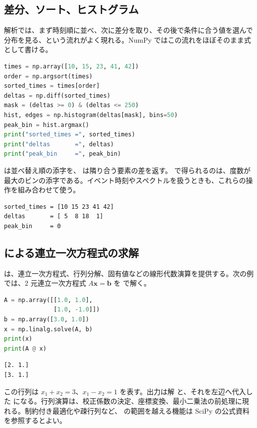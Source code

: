 \subsection{差分、ソート、ヒストグラム}

解析では、まず時刻順に並べ、次に差分を取り、その後で条件に合う値を選んで分布を見る、という流れがよく現れる。NumPy ではこの流れをほぼそのまま式として書ける。

\begin{lstlisting}[language=Python]
times = np.array([10, 15, 23, 41, 42])
order = np.argsort(times)
sorted_times = times[order]
deltas = np.diff(sorted_times)
mask = (deltas >= 0) & (deltas <= 250)
hist, edges = np.histogram(deltas[mask], bins=50)
peak_bin = hist.argmax()
print("sorted_times =", sorted_times)
print("deltas       =", deltas)
print("peak_bin     =", peak_bin)
\end{lstlisting}

 は並べ替え順の添字を、 は隣り合う要素の差を返す。 で得られるのは、度数が最大のビンの添字である。イベント時刻やスペクトルを扱うときも、これらの操作を組み合わせて使う。

\begin{lstlisting}[numbers=none, xleftmargin=2\zw]
sorted_times = [10 15 23 41 42]
deltas       = [ 5  8 18  1]
peak_bin     = 0
\end{lstlisting}

\subsection{ による連立一次方程式の求解}

 は、連立一次方程式、行列分解、固有値などの線形代数演算を提供する。次の例では、2 元連立一次方程式 \(A\boldsymbol{x}=\boldsymbol{b}\) を  で解く。

\begin{lstlisting}[language=Python]
A = np.array([[1.0, 1.0],
              [1.0, -1.0]])
b = np.array([3.0, 1.0])
x = np.linalg.solve(A, b)
print(x)
print(A @ x)
\end{lstlisting}

\begin{lstlisting}[numbers=none, xleftmargin=2\zw]
[2. 1.]
[3. 1.]
\end{lstlisting}

この行列は \(x_1+x_2=3\)、\(x_1-x_2=1\) を表す。出力は解 \code{[2., 1.]} と、それを左辺へ代入した \code{[3., 1.]} になる。行列演算は、校正係数の決定、座標変換、最小二乗法の前処理に現れる。制約付き最適化や疎行列など、 の範囲を越える機能は SciPy の公式資料~\cite{scipy_docs} を参照するとよい。

